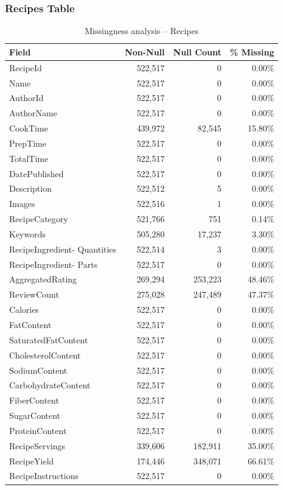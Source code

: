 \documentclass[11pt,a4paper]{article}
\begin{document}
\subsubsection{Recipes Table}

\begin{table}[H]
\centering
\small
\begin{tabular}{lrrr}
\toprule
\textbf{Field} & \textbf{Non-Null} & \textbf{Null Count} & \textbf{\% Missing} \\
\midrule
RecipeId & 522,517 & 0 & 0.00\% \\
Name & 522,517 & 0 & 0.00\% \\
AuthorId & 522,517 & 0 & 0.00\% \\
AuthorName & 522,517 & 0 & 0.00\% \\
CookTime & 439,972 & 82,545 & 15.80\% \\
PrepTime & 522,517 & 0 & 0.00\% \\
TotalTime & 522,517 & 0 & 0.00\% \\
DatePublished & 522,517 & 0 & 0.00\% \\
Description & 522,512 & 5 & 0.00\% \\
Images & 522,516 & 1 & 0.00\% \\
RecipeCategory & 521,766 & 751 & 0.14\% \\
Keywords & 505,280 & 17,237 & 3.30\% \\
RecipeIngredient- Quantities & 522,514 & 3 & 0.00\% \\
RecipeIngredient- Parts & 522,517 & 0 & 0.00\% \\
AggregatedRating & 269,294 & 253,223 & 48.46\% \\
ReviewCount & 275,028 & 247,489 & 47.37\% \\
Calories & 522,517 & 0 & 0.00\% \\
FatContent & 522,517 & 0 & 0.00\% \\
SaturatedFatContent & 522,517 & 0 & 0.00\% \\
CholesterolContent & 522,517 & 0 & 0.00\% \\
SodiumContent & 522,517 & 0 & 0.00\% \\
CarbohydrateContent & 522,517 & 0 & 0.00\% \\
FiberContent & 522,517 & 0 & 0.00\% \\
SugarContent & 522,517 & 0 & 0.00\% \\
ProteinContent & 522,517 & 0 & 0.00\% \\
RecipeServings & 339,606 & 182,911 & 35.00\% \\
RecipeYield & 174,446 & 348,071 & 66.61\% \\
RecipeInstructions & 522,517 & 0 & 0.00\% \\
\bottomrule
\end{tabular}
\caption{Missingness analysis -- Recipes}
\label{tab:missing_recipes}
\end{table}
\end{document}
